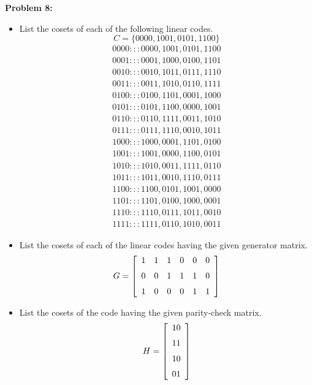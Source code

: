 \documentclass[11pt]{article}
\newenvironment{problem}[1]{\textbf{Problem #1: }}{\newpage}
\begin{document}
	\begin{problem}{8}
		\begin{itemize}
			\item[2.10.6] List the cosets of each of the following linear codes.
			\[C = \{0000, 1001, 0101, 1100\}\]
			\begin{align*} 
			0000 : : : 0000, 1001, 0101, 1100 \\ 
			0001 : : : 0001, 1000, 0100, 1101 \\
			0010 : : : 0010, 1011, 0111, 1110 \\
			0011 : : : 0011, 1010, 0110, 1111 \\
			0100 : : : 0100, 1101, 0001, 1000 \\
			0101 : : : 0101, 1100, 0000, 1001 \\
			0110 : : : 0110, 1111, 0011, 1010 \\
			0111 : : : 0111, 1110, 0010, 1011 \\
			1000 : : : 1000, 0001, 1101, 0100 \\
			1001 : : : 1001, 0000, 1100, 0101 \\
			1010 : : : 1010, 0011, 1111, 0110 \\
			1011 : : : 1011, 0010, 1110, 0111 \\
			1100 : : : 1100, 0101, 1001, 0000 \\
			1101 : : : 1101, 0100, 1000, 0001 \\
			1110 : : : 1110, 0111, 1011, 0010 \\
			1111 : : : 1111, 0110, 1010, 0011 
			\end{align*}
			\item[2.10.7] List the cosets of each of the linear codes having the given generator matrix.
			\[G = \left[\begin{array}{cccccc}
				1&1&1&0&0&0 \\
				\noalign{\medskip} 0&0&1&1&1&0 \\
				\noalign{\medskip} 1&0&0&0&1&1 \\
			\end{array}\right]\]
			\item[2.10.8] List the cosets of the code having the given parity-check matrix.
			\[H = \left[\begin{array}{cc}
				10 \\
				\noalign{\medskip} 11 \\
				\noalign{\medskip} 10 \\
				\noalign{\medskip} 01 \\
			\end{array}\right]\]
		\end{itemize}
	\end{problem}
\end{document}
